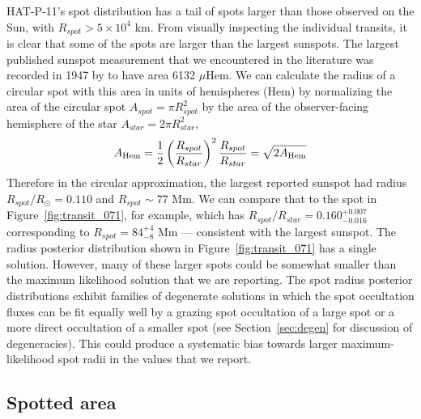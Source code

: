 HAT-P-11's spot distribution has a tail of spots larger than those observed on the Sun, with $R_{spot} > 5 \times 10^4$ km. From visually inspecting the individual transits, it is clear that some of the spots are larger than the largest sunspots. The largest published sunspot measurement that we encountered in the literature was recorded in 1947 by \citet{Newton1955} to have area 6132 $\mu$Hem. We can calculate the radius of a circular spot with this area in units of hemispheres (Hem) by normalizing the area of the circular spot $A_{spot} = \pi R_{spot}^2$ by the area of the observer-facing hemisphere of the star $A_{star} = 2\pi R_{star}^2$,
\begin{equation}
A_{\textrm{Hem}} = \frac{1}{2}\left(\frac{R_{spot}}{R_{star}}\right)^2\\ \\
\frac{R_{spot}}{R_{star}} = \sqrt{2 A_{\textrm{Hem}}}
\end{equation}
Therefore in the circular approximation, the largest reported sunspot had radius $R_{spot}/R_{\odot} = 0.110$ and $R_{spot} \sim 77$ Mm. We can compare that to the spot in Figure~\ref{fig:transit_071}, for example, which has $R_{spot}/R_{star} = 0.160_{-0.016}^{+0.007}$ corresponding to $R_{spot} = 84^{+4}_{-8}$ Mm --- consistent with the largest sunspot. The radius posterior distribution shown in Figure~\ref{fig:transit_071} has a single solution. However, many of these larger spots could be somewhat smaller than the maximum likelihood solution that we are reporting. The spot radius posterior distributions exhibit families of degenerate solutions in which the spot occultation fluxes can be fit equally well by a grazing spot occultation of a large spot or a more direct occultation of a smaller spot (see Section~\ref{sec:degen} for discussion of degeneracies). This could produce a systematic bias towards larger maximum-likelihood spot radii in the values that we report.


\subsection{Spotted area} \label{sec:spotted_area}

